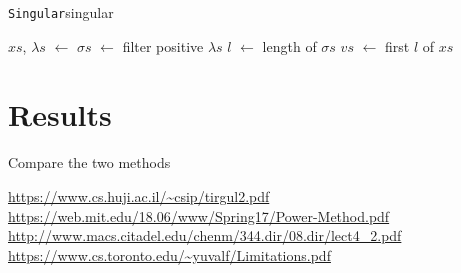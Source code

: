 \documentclass{article}
\def\store{$\leftarrow$ }
\begin{document}
\begin{algo}{\texttt{Singular}}{singular}
  \begin{algorithm}[H]

    \BlankLine
    $xs$, $\lambda s$ \store {}\;
    $\sigma s$ \store filter positive $\lambda s$\;
    $l$ \store length of $\sigma s$\;
    $vs$ \store first $l$ of $xs$\;
  \end{algorithm}
\end{algo}

\section{Results}
Compare the two methods

\begin{thebibliography}{9}
   \url{https://www.cs.huji.ac.il/\~csip/tirgul2.pdf}
   \url{https://web.mit.edu/18.06/www/Spring17/Power-Method.pdf}
   \url{http://www.macs.citadel.edu/chenm/344.dir/08.dir/lect4_2.pdf}
   \url{https://www.cs.toronto.edu/\~yuvalf/Limitations.pdf}
\end{thebibliography}
\end{document}
